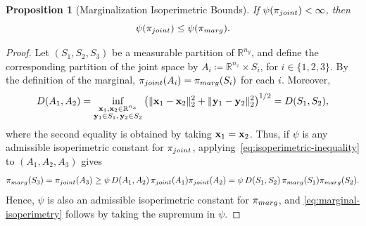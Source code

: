 \documentclass[10pt,a4paper]{amsart}
\newtheorem{proposition}{Proposition}
\newcommand{\bbR}{\mathbb{R}}
\newcommand{\bfx}{{\bf x}}
\newcommand{\bfy}{{\bf y}}
\newcommand{\nx}{{n_{x}}}
\newcommand{\ny}{{n_{y}}}
\newcommand{\pjoint}{\pi_{\rm joint}}
\newcommand{\pmarg}{\pi_{\rm marg}}
\begin{document}
\begin{proposition}[Marginalization Isoperimetric Bounds]
  \label{prop:marginal-isoperimetry}
  If $\psi(\pjoint) < \infty$, then
  \begin{equation}
    \label{eq:marginal-isoperimetry}
    \psi(\pjoint) \leq \psi(\pmarg).
  \end{equation}
\end{proposition}

\begin{proof}
  Let $(S_1,S_2,S_3)$ be a measurable partition of $\bbR^\ny$, and define the corresponding partition of the joint space by $A_i \coloneqq \bbR^\nx \times S_i$, for $i \in \{1,2,3\}$.
  By the definition of the marginal, $\pjoint(A_i)=\pmarg(S_i)$ for each $i$.
  Moreover,
  \begin{equation*}
    D(A_1,A_2)
    = \inf_{\substack{\bfx_1,\bfx_2\in\bbR^\nx\\ \bfy_1\in S_1,\,\bfy_2\in S_2}}
    \left( \|\bfx_1-\bfx_2\|_2^2 + \|\bfy_1-\bfy_2\|_2^2 \right)^{1 / 2}
    = D(S_1,S_2),
  \end{equation*}
  where %
  the second equality is obtained by taking $\bfx_1=\bfx_2$.
  Thus, if $\psi$ is any admissible isoperimetric constant for $\pjoint$, applying~\eqref{eq:isoperimetric-inequality} to $(A_1,A_2,A_3)$ gives
  \begin{equation*}
    \pmarg(S_3)  = \pjoint(A_3)
    \geq \psi\,D(A_1,A_2)\,\pjoint(A_1)\pjoint(A_2)
    = \psi\,D(S_1,S_2)\,\pmarg(S_1)\pmarg(S_2).
  \end{equation*}
  Hence, $\psi$ is also an admissible isoperimetric constant for $\pmarg$, and
  \eqref{eq:marginal-isoperimetry} follows by taking the supremum in $\psi$.
\end{proof}
\end{document}
